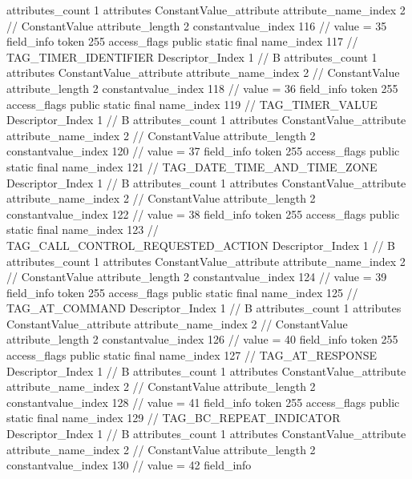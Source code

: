 {{{{{				attributes_count	1
				attributes {
				ConstantValue_attribute {
					attribute_name_index	2		// ConstantValue
					attribute_length	2
					constantvalue_index	116		// value = 35
				}
				}
			}
			field_info {
				token	255
				access_flags	public static final
				name_index	117		// TAG_TIMER_IDENTIFIER
				Descriptor_Index	1		// B
				attributes_count	1
				attributes {
				ConstantValue_attribute {
					attribute_name_index	2		// ConstantValue
					attribute_length	2
					constantvalue_index	118		// value = 36
				}
				}
			}
			field_info {
				token	255
				access_flags	public static final
				name_index	119		// TAG_TIMER_VALUE
				Descriptor_Index	1		// B
				attributes_count	1
				attributes {
				ConstantValue_attribute {
					attribute_name_index	2		// ConstantValue
					attribute_length	2
					constantvalue_index	120		// value = 37
				}
				}
			}
			field_info {
				token	255
				access_flags	public static final
				name_index	121		// TAG_DATE_TIME_AND_TIME_ZONE
				Descriptor_Index	1		// B
				attributes_count	1
				attributes {
				ConstantValue_attribute {
					attribute_name_index	2		// ConstantValue
					attribute_length	2
					constantvalue_index	122		// value = 38
				}
				}
			}
			field_info {
				token	255
				access_flags	public static final
				name_index	123		// TAG_CALL_CONTROL_REQUESTED_ACTION
				Descriptor_Index	1		// B
				attributes_count	1
				attributes {
				ConstantValue_attribute {
					attribute_name_index	2		// ConstantValue
					attribute_length	2
					constantvalue_index	124		// value = 39
				}
				}
			}
			field_info {
				token	255
				access_flags	public static final
				name_index	125		// TAG_AT_COMMAND
				Descriptor_Index	1		// B
				attributes_count	1
				attributes {
				ConstantValue_attribute {
					attribute_name_index	2		// ConstantValue
					attribute_length	2
					constantvalue_index	126		// value = 40
				}
				}
			}
			field_info {
				token	255
				access_flags	public static final
				name_index	127		// TAG_AT_RESPONSE
				Descriptor_Index	1		// B
				attributes_count	1
				attributes {
				ConstantValue_attribute {
					attribute_name_index	2		// ConstantValue
					attribute_length	2
					constantvalue_index	128		// value = 41
				}
				}
			}
			field_info {
				token	255
				access_flags	public static final
				name_index	129		// TAG_BC_REPEAT_INDICATOR
				Descriptor_Index	1		// B
				attributes_count	1
				attributes {
				ConstantValue_attribute {
					attribute_name_index	2		// ConstantValue
					attribute_length	2
					constantvalue_index	130		// value = 42
				}
				}
			}
			field_info {
}}}}}
